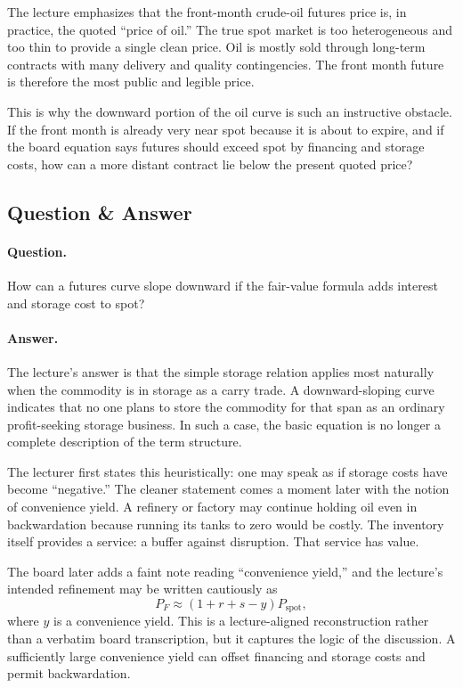 The lecture emphasizes that the front-month crude-oil futures price is, in practice, the quoted ``price of oil.'' The true spot market is too heterogeneous and too thin to provide a single clean price. Oil is mostly sold through long-term contracts with many delivery and quality contingencies. The front month future is therefore the most public and legible price.

This is why the downward portion of the oil curve is such an instructive obstacle. If the front month is already very near spot because it is about to expire, and if the board equation says futures should exceed spot by financing and storage costs, how can a more distant contract lie below the present quoted price?

\subsection{Question \& Answer}

\paragraph{Question.} How can a futures curve slope downward if the fair-value formula adds interest and storage cost to spot?

\paragraph{Answer.} The lecture's answer is that the simple storage relation applies most naturally when the commodity is in storage as a carry trade. A downward-sloping curve indicates that no one plans to store the commodity for that span as an ordinary profit-seeking storage business. In such a case, the basic equation is no longer a complete description of the term structure.

The lecturer first states this heuristically: one may speak as if storage costs have become ``negative.'' The cleaner statement comes a moment later with the notion of convenience yield. A refinery or factory may continue holding oil even in backwardation because running its tanks to zero would be costly. The inventory itself provides a service: a buffer against disruption. That service has value.

The board later adds a faint note reading ``convenience yield,'' and the lecture's intended refinement may be written cautiously as
\begin{equation}
P_F \approx (1+r+s-y)P_{\text{spot}},
\end{equation}
where $y$ is a convenience yield. This is a lecture-aligned reconstruction rather than a verbatim board transcription, but it captures the logic of the discussion. A sufficiently large convenience yield can offset financing and storage costs and permit backwardation.

